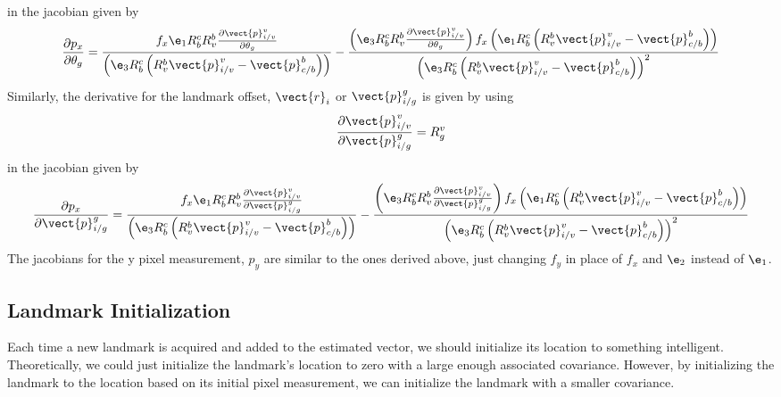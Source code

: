 in the jacobian given by
\begin{equation}
  \frac{\partial p_x}{\partial \theta_g} =
  \frac{f_x \e_1 R_b^c R_v^b \frac{\partial \vect{p}_{i/v}^v}{\partial \theta_g}}
    {\left(\e_3 R_b^c \left(R_v^b \vect{p}_{i/v}^v -
    \vect{p}_{c/b}^b\right)\right)}
    - \frac{\left(\e_3 R_b^c R_v^b \frac{\partial \vect{p}_{i/v}^v}{\partial \theta_g} \right) f_x \left(\e_1 R_b^c \left(R_v^b \vect{p}_{i/v}^v -
        \vect{p}_{c/b}^b\right)\right)} {\left(\e_3 R_b^c \left(R_v^b \vect{p}_{i/v}^v -
  \vect{p}_{c/b}^b\right)\right)^2}
\end{equation}
Similarly, the derivative for the landmark offset, $\vect{r}_i$ or
$\vect{p}_{i/g}^g$ is given by using
\begin{equation}
  \frac{\partial \vect{p}_{i/v}^v}{\partial \vect{p}_{i/g}^g} = R_g^v 
\end{equation}
in the jacobian given by
\begin{equation}
  \frac{\partial p_x}{\partial \vect{p}_{i/g}^g} =
  \frac{f_x \e_1 R_b^c R_v^b \frac{\partial \vect{p}_{i/v}^v}{\partial \vect{p}_{i/g}^g}}
    {\left(\e_3 R_b^c \left(R_v^b \vect{p}_{i/v}^v -
    \vect{p}_{c/b}^b\right)\right)}
    - \frac{\left(\e_3 R_b^c R_v^b \frac{\partial \vect{p}_{i/v}^v}{\partial \vect{p}_{i/g}^g} \right) f_x \left(\e_1 R_b^c \left(R_v^b \vect{p}_{i/v}^v -
        \vect{p}_{c/b}^b\right)\right)} {\left(\e_3 R_b^c \left(R_v^b \vect{p}_{i/v}^v -
  \vect{p}_{c/b}^b\right)\right)^2}
\end{equation}
The jacobians for the y pixel measurement, $p_y$ are similar to the ones derived
above, just changing $f_y$ in place of $f_x$ and $\e_2$ instead of $\e_1$.

\subsection{Landmark Initialization}
Each time a new landmark is acquired and added to the estimated vector, we
should initialize its location to something intelligent. Theoretically, we could
just initialize the landmark's location to zero with a large enough associated
covariance. However, by initializing the landmark to the location based on its
initial pixel measurement, we can initialize the landmark with a smaller
covariance.

